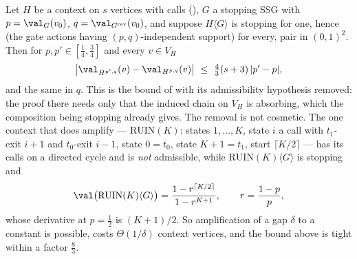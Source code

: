 \begin{proposition}\label{prop:wo-gate-lipschitz}
Let $H$ be a context on $s$ vertices with calls (), $G$ a
stopping SSG with $p=\val_G(v_0)$, $q=\val_{G^{\mathrm{rev}}}(v_0)$, and
suppose $H\langle G\rangle$ is stopping for one, hence (the gate actions having
$(p,q)$-independent support) for every, pair in $(0,1)^{2}$. Then for
$p,p'\in[\tfrac14,\tfrac34]$ and every $v\in V_H$
\[
  \bigl|\val_{H^{p',q}}(v)-\val_{H^{p,q}}(v)\bigr|\ \le\ \tfrac43(s+3)\,|p'-p|,
\]
and the same in $q$. This is the bound of  with its
admissibility hypothesis removed: the proof there needs only that the induced
chain on $V_H$ is absorbing, which the composition being stopping already
gives. The removal is not cosmetic. The one context that does amplify ---
$\mathrm{RUIN}(K)$: states $1,\dots,K$, state $i$ a call with $t_1$-exit
$i+1$ and $t_0$-exit $i-1$, state $0=t_0$, state $K+1=t_1$, start
$\lceil K/2\rceil$ --- has its calls on a directed cycle and is \emph{not}
admissible, while $\mathrm{RUIN}(K)\langle G\rangle$ is stopping and
\[
  \val\bigl(\mathrm{RUIN}(K)\langle G\rangle\bigr)
  =\frac{1-r^{\lceil K/2\rceil}}{1-r^{K+1}},\qquad r=\frac{1-p}{p},
\]
whose derivative at $p=\tfrac12$ is $(K+1)/2$. So amplification of a gap
$\delta$ to a constant is possible, costs $\Theta(1/\delta)$ context vertices,
and the bound above is tight within a factor $\tfrac83$.
\end{proposition}

